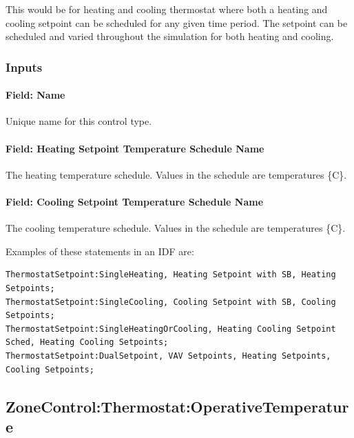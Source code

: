 This would be for heating and cooling thermostat where both a heating and cooling setpoint can be scheduled for any given time period. The setpoint can be scheduled and varied throughout the simulation for both heating and cooling.

\subsubsection{Inputs}\label{inputs-4-039}

\paragraph{Field: Name}\label{field-name-4-034}

Unique name for this control type.

\paragraph{Field: Heating Setpoint Temperature Schedule Name}\label{field-heating-setpoint-temperature-schedule-name-000}

The heating temperature schedule. Values in the schedule are temperatures \{C\}.

\paragraph{Field: Cooling Setpoint Temperature Schedule Name}\label{field-cooling-setpoint-temperature-schedule-name}

The cooling temperature schedule. Values in the schedule are temperatures \{C\}.

Examples of these statements in an IDF are:

\begin{lstlisting}
ThermostatSetpoint:SingleHeating, Heating Setpoint with SB, Heating Setpoints;
ThermostatSetpoint:SingleCooling, Cooling Setpoint with SB, Cooling Setpoints;
ThermostatSetpoint:SingleHeatingOrCooling, Heating Cooling Setpoint Sched, Heating Cooling Setpoints;
ThermostatSetpoint:DualSetpoint, VAV Setpoints, Heating Setpoints, Cooling Setpoints;
\end{lstlisting}

\subsection{ZoneControl:Thermostat:OperativeTemperature}\label{zonecontrolthermostatoperativetemperature}

